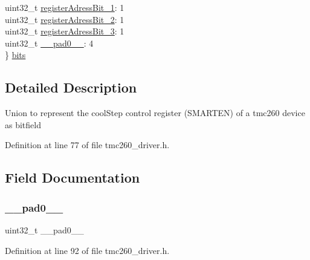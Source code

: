 \begin{DoxyCompactItemize}
\begin{tabbing}
\>uint32\_t \mbox{\hyperlink{union_cool_step_control_register___a8e58d0701295971bc3d890f5107f8aa5}{registerAdressBit\_1}}: 1\\
\>uint32\_t \mbox{\hyperlink{union_cool_step_control_register___abd6d1c957737511340b85f5c2d61f9ab}{registerAdressBit\_2}}: 1\\
\>uint32\_t \mbox{\hyperlink{union_cool_step_control_register___a3da0387ab629039b91d051ab328910f0}{registerAdressBit\_3}}: 1\\
\>uint32\_t \mbox{\hyperlink{union_cool_step_control_register___a3e57c2ef1c3ffb36722f000cc1156824}{\_\_pad0\_\_}}: 4\\
\} \mbox{\hyperlink{union_cool_step_control_register___a2b4d1a5feeacad886bebe555d2851dea}{bits}}\\

\end{tabbing}\end{DoxyCompactItemize}


\subsection{Detailed Description}
Union to represent the cool\+Step control register (S\+M\+A\+R\+T\+EN) of a tmc260 device as bitfield 

Definition at line 77 of file tmc260\+\_\+driver.\+h.



\subsection{Field Documentation}
\mbox{\label{union_cool_step_control_register___a3e57c2ef1c3ffb36722f000cc1156824}} 
\subsubsection{\texorpdfstring{\+\_\+\+\_\+pad0\+\_\+\+\_\+}{\_\_pad0\_\_}}
{\footnotesize\ttfamily uint32\+\_\+t \+\_\+\+\_\+pad0\+\_\+\+\_\+}



Definition at line 92 of file tmc260\+\_\+driver.\+h.

